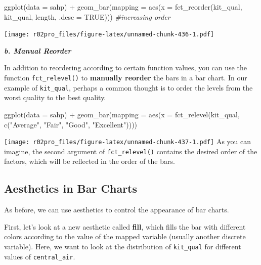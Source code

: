 \documentclass[
]{book}
\newenvironment{Shaded}{\begin{snugshade}}{\end{snugshade}}
\newcommand{\AttributeTok}[1]{\textcolor[rgb]{0.77,0.63,0.00}{#1}}
\newcommand{\CommentTok}[1]{\textcolor[rgb]{0.56,0.35,0.01}{\textit{#1}}}
\newcommand{\ConstantTok}[1]{\textcolor[rgb]{0.00,0.00,0.00}{#1}}
\newcommand{\FunctionTok}[1]{\textcolor[rgb]{0.00,0.00,0.00}{#1}}
\newcommand{\NormalTok}[1]{#1}
\newcommand{\SpecialCharTok}[1]{\textcolor[rgb]{0.00,0.00,0.00}{#1}}
\newcommand{\StringTok}[1]{\textcolor[rgb]{0.31,0.60,0.02}{#1}}
\begin{document}
\begin{Shaded}
\begin{Highlighting}[]
\FunctionTok{ggplot}\NormalTok{(}\AttributeTok{data =}\NormalTok{ sahp) }\SpecialCharTok{+} \FunctionTok{geom\_bar}\NormalTok{(}\AttributeTok{mapping =} \FunctionTok{aes}\NormalTok{(}\AttributeTok{x =} \FunctionTok{fct\_reorder}\NormalTok{(kit\_qual, kit\_qual, length, }\AttributeTok{.desc =} \ConstantTok{TRUE}\NormalTok{))) }\CommentTok{\#increasing order}
\end{Highlighting}
\end{Shaded}

\texttt{[image: r02pro\_files/figure-latex/unnamed-chunk-436-1.pdf]}

\textbf{\emph{b. Manual Reorder}}

In addition to reordering according to certain function values, you can use the function \texttt{fct\_relevel()} to \textbf{manually reorder} the bars in a bar chart. In our example of \texttt{kit\_qual}, perhaps a common thought is to order the levels from the worst quality to the best quality.

\begin{Shaded}
\begin{Highlighting}[]
\FunctionTok{ggplot}\NormalTok{(}\AttributeTok{data =}\NormalTok{ sahp) }\SpecialCharTok{+}
  \FunctionTok{geom\_bar}\NormalTok{(}\AttributeTok{mapping =} \FunctionTok{aes}\NormalTok{(}\AttributeTok{x =} \FunctionTok{fct\_relevel}\NormalTok{(kit\_qual, }\FunctionTok{c}\NormalTok{(}\StringTok{"Average"}\NormalTok{, }\StringTok{"Fair"}\NormalTok{, }\StringTok{"Good"}\NormalTok{, }\StringTok{"Excellent"}\NormalTok{))))}
\end{Highlighting}
\end{Shaded}

\texttt{[image: r02pro\_files/figure-latex/unnamed-chunk-437-1.pdf]}
As you can imagine, the second argument of \texttt{fct\_relevel()} contains the desired order of the factors, which will be reflected in the order of the bars.

\hypertarget{aesthetics-in-bar-charts}{%
\subsection{Aesthetics in Bar Charts}\label{aesthetics-in-bar-charts}}

As before, we can use aesthetics to control the appearance of bar charts.

First, let's look at a new aesthetic called \textbf{fill}, which fills the bar with different colors according to the value of the mapped variable (usually another discrete variable). Here, we want to look at the distribution of \texttt{kit\_qual} for different values of \texttt{central\_air}.
\end{document}
